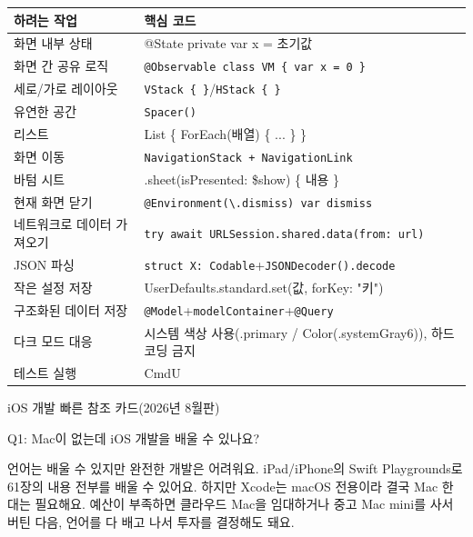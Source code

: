 


\begin{center}
\begin{tabularx}{\linewidth}{|X|X|}
\hline
\textbf{하려는 작업} & \textbf{핵심 코드} \tabularnewline
\hline
화면 내부 상태 & @State private var x = 초기값 \tabularnewline
화면 간 공유 로직 & \texttt{@Observable class VM \{ var x = 0 \}} \tabularnewline
세로/가로 레이아웃 & \texttt{VStack \{ \}}/\texttt{HStack \{ \}} \tabularnewline
유연한 공간 & \texttt{Spacer()} \tabularnewline
리스트 & List \{ ForEach(배열) \{ ... \} \} \tabularnewline
화면 이동 & \texttt{NavigationStack + NavigationLink} \tabularnewline
바텀 시트 & .sheet(isPresented: \$show) \{ 내용 \} \tabularnewline
현재 화면 닫기 & \texttt{@Environment(\textbackslash{}.\allowbreak dismiss) var dismiss} \tabularnewline
네트워크로 데이터 가져오기 & \texttt{try await URLSession.\allowbreak shared.\allowbreak data(from: url)} \tabularnewline
JSON 파싱 & \texttt{struct X: Codable}+\texttt{JSONDecoder().\allowbreak decode} \tabularnewline
작은 설정 저장 & UserDefaults.standard.set(값, forKey: "키") \tabularnewline
구조화된 데이터 저장 & \texttt{@Model}+\texttt{modelContainer}+\texttt{@Query} \tabularnewline
다크 모드 대응 & 시스템 색상 사용(.primary / Color(.systemGray6)), 하드코딩 금지 \tabularnewline
테스트 실행 & CmdU \tabularnewline
\hline
\end{tabularx}
\end{center}

\begin{center}\small\color{gray}iOS 개발 빠른 참조 카드(2026년 8월판)\end{center}


Q1: Mac이 없는데 iOS 개발을 배울 수 있나요?

언어는 배울 수 있지만 완전한 개발은 어려워요. iPad/iPhone의 Swift Playgrounds로 61장의 내용 전부를 배울 수 있어요. 하지만 Xcode는 macOS 전용이라 결국 Mac 한 대는 필요해요. 예산이 부족하면 클라우드 Mac을 임대하거나 중고 Mac mini를 사서 버틴 다음, 언어를 다 배고 나서 투자를 결정해도 돼요.

